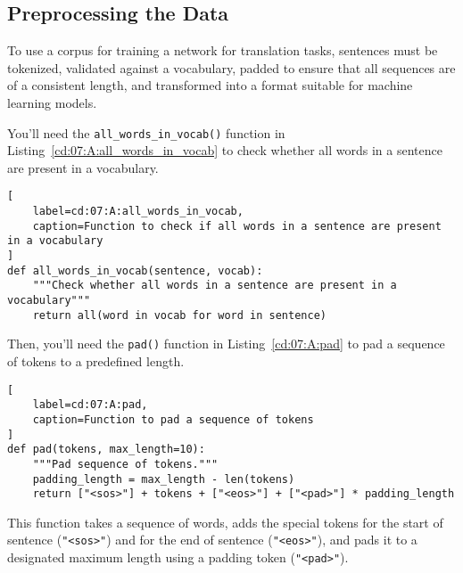 \subsection{Preprocessing the Data}

To use a corpus for training a network for translation tasks, sentences must be tokenized, validated against a vocabulary, padded to ensure that all sequences are of a consistent length, and transformed into a format suitable for machine learning models. 

You'll need the \lstinline{all_words_in_vocab()} function in Listing~\ref{cd:07:A:all_words_in_vocab} to check whether all words in a sentence are present in a vocabulary.
\begin{lstlisting}[
    label=cd:07:A:all_words_in_vocab,
    caption=Function to check if all words in a sentence are present in a vocabulary
]
def all_words_in_vocab(sentence, vocab):
    """Check whether all words in a sentence are present in a vocabulary"""
    return all(word in vocab for word in sentence)
\end{lstlisting}

Then, you'll need the \lstinline{pad()} function in Listing~\ref{cd:07:A:pad} to pad a sequence of tokens to a predefined length.
\begin{lstlisting}[
    label=cd:07:A:pad,
    caption=Function to pad a sequence of tokens
]
def pad(tokens, max_length=10):
    """Pad sequence of tokens."""
    padding_length = max_length - len(tokens)
    return ["<sos>"] + tokens + ["<eos>"] + ["<pad>"] * padding_length
\end{lstlisting}
This function takes a sequence of words, adds the special tokens for the start of sentence (\lstinline{"<sos>"}) and for the end of sentence (\lstinline{"<eos>"}), and pads it to a designated maximum length using a padding token (\lstinline{"<pad>"}).

